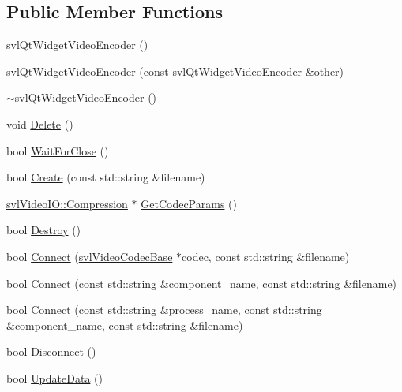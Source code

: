 \subsection*{Public Member Functions}
\begin{DoxyCompactItemize}
\item 
\hyperlink{classsvl_qt_widget_video_encoder_a43bc3fcd8b3283a120f1eb208f2629a9}{svl\-Qt\-Widget\-Video\-Encoder} ()
\item 
\hyperlink{classsvl_qt_widget_video_encoder_af512ab260868ebba43079be4402c33f8}{svl\-Qt\-Widget\-Video\-Encoder} (const \hyperlink{classsvl_qt_widget_video_encoder}{svl\-Qt\-Widget\-Video\-Encoder} \&other)
\item 
\hyperlink{classsvl_qt_widget_video_encoder_a3b974deb575a42c92e96cc60972ce6f7}{$\sim$svl\-Qt\-Widget\-Video\-Encoder} ()
\item 
void \hyperlink{classsvl_qt_widget_video_encoder_ae4af0a601c5fe578616ad09b251b4119}{Delete} ()
\item 
bool \hyperlink{classsvl_qt_widget_video_encoder_a4655de59f178c4688ca4fd693221b187}{Wait\-For\-Close} ()
\item 
bool \hyperlink{classsvl_qt_widget_video_encoder_ac01a158f6afc0310172cb4a107d8c5d4}{Create} (const std\-::string \&filename)
\item 
\hyperlink{classsvl_video_i_o_a932d071ec9be4fefde824ab9b9125282}{svl\-Video\-I\-O\-::\-Compression} $\ast$ \hyperlink{classsvl_qt_widget_video_encoder_aa1e039036a6fd6ba95d88173c0419d5e}{Get\-Codec\-Params} ()
\item 
bool \hyperlink{classsvl_qt_widget_video_encoder_a25567b646761062b3d32f25bdd21d0df}{Destroy} ()
\item 
bool \hyperlink{classsvl_qt_widget_video_encoder_a880c4ccc20b37e438510daa4fc30e628}{Connect} (\hyperlink{classsvl_video_codec_base}{svl\-Video\-Codec\-Base} $\ast$codec, const std\-::string \&filename)
\item 
bool \hyperlink{classsvl_qt_widget_video_encoder_a2fbfcf1ba24bb98b299e32a55b7ec84d}{Connect} (const std\-::string \&component\-\_\-name, const std\-::string \&filename)
\item 
bool \hyperlink{classsvl_qt_widget_video_encoder_a7ef3026c2087b14b3d8ff46533d63706}{Connect} (const std\-::string \&process\-\_\-name, const std\-::string \&component\-\_\-name, const std\-::string \&filename)
\item 
bool \hyperlink{classsvl_qt_widget_video_encoder_a8915429476e1d0f82236d6d6628efa7a}{Disconnect} ()
\item 
bool \hyperlink{classsvl_qt_widget_video_encoder_a16d010418b92aaa354ac712481a8ce79}{Update\-Data} ()
\end{DoxyCompactItemize}
